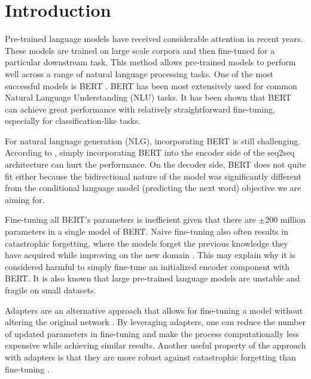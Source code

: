\chapter*{Introduction}

Pre-trained language models \cite{devlin2018bert,howard2018universal} have received considerable attention in recent years. These models are trained on large scale corpora and then fine-tuned for a particular downstream task. This method allows pre-trained models to perform well across a range of natural language processing tasks. One of the most successful models is BERT \cite{devlin2018bert}. BERT has been most extensively used for common Natural Language Understanding (NLU) tasks. It has been shown that BERT can achieve great performance with relatively straightforward fine-tuning, especially for classification-like tasks.

For natural language generation (NLG), incorporating BERT is still challenging. According to \citet{zhu2020incorporating}, simply incorporating BERT into the encoder side of the seq2seq architecture can hurt the performance. On the decoder side, BERT does not quite fit either because the bidirectional nature of the model was significantly different from the conditional language model (predicting the next word) objective we are aiming for.

Fine-tuning all BERT's parameters is inefficient given that there are $\pm$200 million parameters in a single model of BERT. Naive fine-tuning also often results in catastrophic forgetting, where the models forget the previous knowledge they have acquired while improving on the new domain \cite{mccloskey1989catastrophic,yogatama2019learning}. This may explain why it is considered harmful to simply fine-tune an initialized encoder component with BERT. It is also known that large pre-trained language models are unstable and fragile on small datasets.

Adapters are an alternative approach that allows for fine-tuning a model without altering the original network \cite{houlsby2019parameter,bapna2019simple}. By leveraging adapters, one can reduce the number of updated parameters in fine-tuning and make the process computationally less expensive while achieving similar results. Another useful property of the approach with adapters is that they are more robust against catastrophic forgetting than fine-tuning \cite{han2021robust}.

